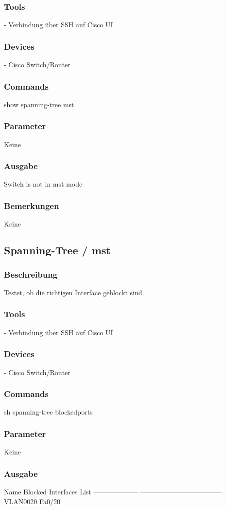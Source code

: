 \documentclass[a4,12pt]{scrartcl}
\begin{document}
\subsubsection{Tools}
- Verbindung über SSH auf Cisco UI
\subsubsection{Devices}
- Cisco Switch/Router
\subsubsection{Commands}
show spanning-tree mst
\subsubsection{Parameter}
Keine
\subsubsection{Ausgabe}
Switch is not in mst mode
\subsubsection{Bemerkungen}
Keine



\subsection{Spanning-Tree / mst}
\subsubsection{Beschreibung}
Testet, ob die richtigen Interface geblockt sind.
\subsubsection{Tools}
- Verbindung über SSH auf Cisco UI 
\subsubsection{Devices}
- Cisco Switch/Router
\subsubsection{Commands}
sh spanning-tree blockedports
\subsubsection{Parameter}
Keine
\subsubsection{Ausgabe}
Name                 Blocked Interfaces List\newline
-------------------- ------------------------------------\newline
VLAN0020             Fa0/20\newline
\end{document}
